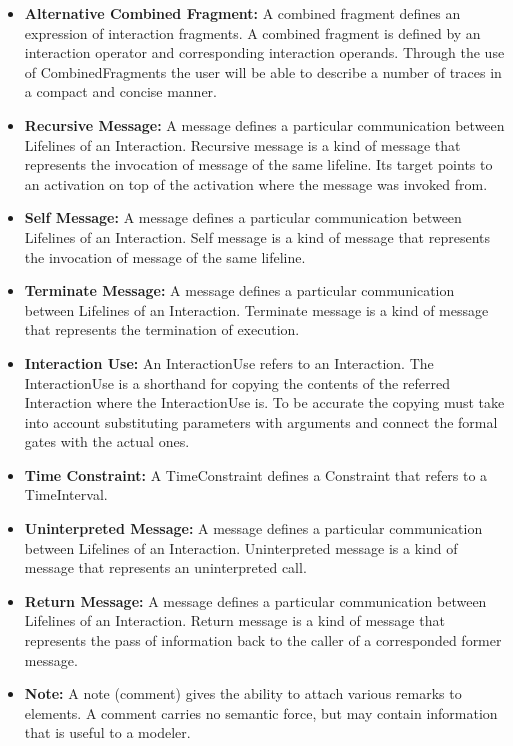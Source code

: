 \begin{itemize}
	\item \textbf{Alternative Combined Fragment:} A combined fragment defines an expression of interaction fragments. A combined fragment is defined by an interaction operator and corresponding interaction operands. Through the use of CombinedFragments the user will be able to describe a number of traces in a compact and concise manner.
	
	\item \textbf{Recursive Message:} A message defines a particular communication between Lifelines of an Interaction. Recursive message is a kind of message that represents the invocation of message of the same lifeline. Its target points to an activation on top of the activation where the message was invoked from.
	
	\item \textbf{Self Message:} A message defines a particular communication between Lifelines of an Interaction. Self message is a kind of message that represents the invocation of message of the same lifeline.
	
	\item \textbf{Terminate Message:} A message defines a particular communication between Lifelines of an Interaction. Terminate message is a kind of message that represents the termination of execution.
	
	\item \textbf{Interaction Use:} An InteractionUse refers to an Interaction. The InteractionUse is a shorthand for copying the contents of the referred Interaction where the InteractionUse is. To be accurate the copying must take into account substituting parameters with arguments and connect the formal gates with the actual ones.
	
	\item \textbf{Time Constraint:} A TimeConstraint defines a Constraint that refers to a TimeInterval.
	
	\item \textbf{Uninterpreted Message:} A message defines a particular communication between Lifelines of an Interaction. Uninterpreted message is a kind of message that represents an uninterpreted call.
	
	\item \textbf{Return Message:} A message defines a particular communication between Lifelines of an Interaction. Return message is a kind of message that represents the pass of information back to the caller of a corresponded former message.
	
	\item \textbf{Note:} A note (comment) gives the ability to attach various remarks to elements. A comment carries no semantic force, but may contain information that is useful to a modeler.	
	
\end{itemize}

